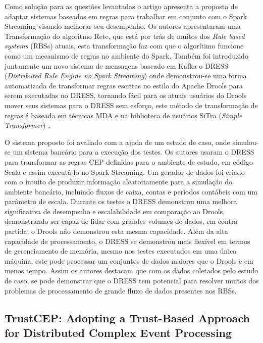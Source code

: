 \documentclass[ti,table]{texufpel} %
\begin{document}
	Como solução para as questões levantadas o artigo apresenta a proposta de adaptar sistemas baseados em regras para trabalhar em conjunto com o Spark Streaming visando melhorar seu desempenho. Os autores apresentaram uma Transformação do algoritmo Rete, que está por trás de muitos dos \textit{Rule based systems} (RBSs) atuais, esta transformação faz com que o algorítimo funcione como um mecanismo de regras no ambiente do Spark. Também foi introduzido juntamente um novo sistema de mensagens baseado em Kafka o DRESS (\textit{Distributed Rule Engine no Spark Streaming}) onde demonstrou-se uma forma automatizada de transformar regras escritas no estilo do Apache Drools para serem executadas no DRESS, tornando fácil para os atuais usuários do Drools mover seus sistemas para o DRESS sem esforço, este método de transformação de regras é baseada em técnicas MDA e na biblioteca de usuários SiTra (\textit{Simple Transformer})  \cite{art5chen2016dress} .
	
	O sistema proposto foi avaliado com a ajuda de um estudo de caso, onde simulou-se um sistema bancário para a execução dos testes. Os autores usaram o DRESS para transformar as regras CEP definidas para o ambiente de estudo, em código Scala e assim executá-lo no Spark Streaming. Um gerador de dados foi criado com o intuito de produzir informação aleatoriamente para a simulação do ambiente bancário, incluindo fluxos de caixa, contas e períodos contábeis com um parâmetro de escala. Durante os testes o DRESS demonstrou uma melhora significativa de desempenho e escalabilidade em comparação ao Drools, demonstrando ser capaz de lidar com grandes volumes de dados, em contra partida, o Drools não demonstrou esta mesma capacidade. Além  da alta capacidade de processamento, o DRESS se demonstrou mais flexível em termos de gerenciamento de memória, mesmo nos testes executados em uma única máquina, este pode processar um conjuntos de dados maiores que o Drools e em menos tempo. Assim os autores destacam que com os dados coletados pelo estudo de caso, se pode demonstrar que o DRESS tem potencial para resolver muitos dos problemas de processamento de grande fluxo de dados presentes nos RBSs.
	


\subsection{TrustCEP: Adopting a Trust-Based Approach for Distributed Complex Event Processing}
\end{document}
